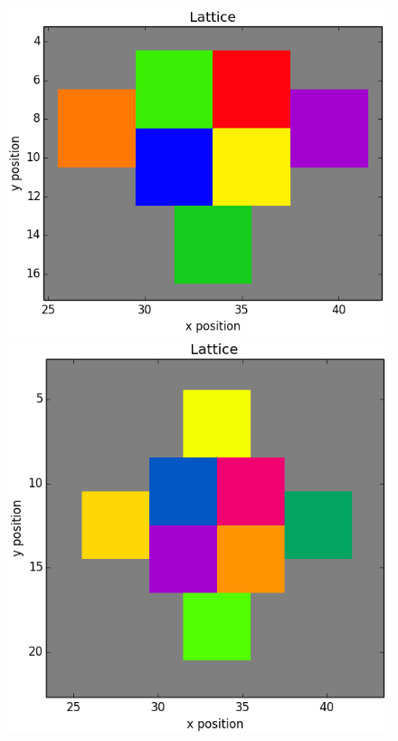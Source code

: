 \documentclass[12pt]{article}
\begin{document}
\begin{figure}[h]
	\includegraphics[scale=0.20]{img/7ctc_start}
	\includegraphics[scale=0.20]{img/8ctc_start}

\end{figure}
\end{document}
